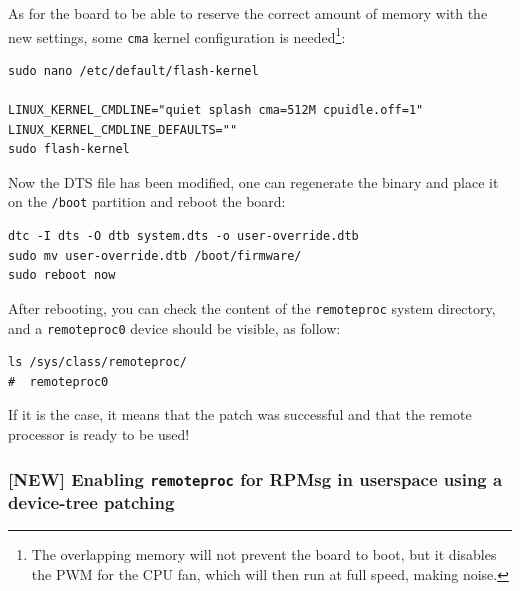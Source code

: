 \documentclass[10pt]{article}
\begin{document}
As for the board to be able to reserve the correct amount of memory with the new settings, some
\texttt{cma} kernel configuration is needed\footnote{The overlapping memory will not prevent the board to boot,
but it disables the PWM for the CPU fan, which will then run at full speed, making noise.}:

\begin{verbatim}
sudo nano /etc/default/flash-kernel

LINUX_KERNEL_CMDLINE="quiet splash cma=512M cpuidle.off=1"
LINUX_KERNEL_CMDLINE_DEFAULTS=""
sudo flash-kernel
\end{verbatim}

Now the DTS file has been modified, one can regenerate the binary and place it on the \texttt{/boot} partition
and reboot the board:

\begin{verbatim}
dtc -I dts -O dtb system.dts -o user-override.dtb
sudo mv user-override.dtb /boot/firmware/
sudo reboot now
\end{verbatim}

After rebooting, you can check the content of the \verb|remoteproc| system directory,
and a \texttt{remoteproc0} device should be visible, as follow:

\begin{verbatim}
ls /sys/class/remoteproc/
#  remoteproc0
\end{verbatim}

If it is the case, it means that the patch was successful and  that the remote processor is
ready to be used!
\pagebreak

\subsubsection{[NEW] Enabling \texttt{remoteproc} for RPMsg in userspace using a device-tree patching}
\label{sec:org324d743}
\end{document}

